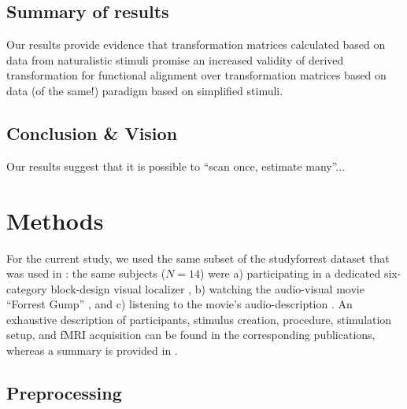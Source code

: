 \subsection{Summary of results}


%
Our results provide evidence that transformation matrices calculated based
on data from naturalistic stimuli promise an increased validity of derived
transformation for functional alignment over transformation matrices based on
data (of the same!) paradigm based on simplified stimuli.



\subsection{Conclusion \& Vision}


Our results suggest that it is possible to ``scan once, estimate many''...



\section{Methods}


For the current study, we used the same subset of the studyforrest dataset that
was used in \citet{haeusler2022processing}:
%
the same subjects ($N=14$) were
a) participating in a dedicated six-category block-design visual localizer
\citep{sengupta2016extension},
b) watching the audio-visual movie ``Forrest Gump''
\citep{hanke2016simultaneous}, and
c) listening to the movie's audio-description \citep{hanke2014audiomovie}.
An exhaustive description of participants, stimulus creation, procedure,
stimulation setup, and fMRI acquisition can be found in the corresponding
publications, whereas a summary is provided in \citet{haeusler2022processing}.



\subsection{Preprocessing}

